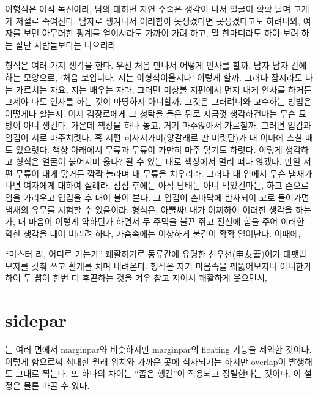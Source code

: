 \documentclass{oblivoir}
\begin{document}
이형식은 아직 독신이라, 남의  대하면 자연 수줍은 생각이 나서 얼굴이 확확 달며 고개가 저절로 숙여진다. 남자로 생겨나서 이러함이 못생겼다면 못생겼다고도 하려니와, 여자를 보면 아무러한 핑계를 얻어서라도 가까이 가려 하고, 말 한마디라도 하여 보려 하는 잘난 사람들보다는 나으리라.

형식은 여러 가지 생각을 한다. 우선 처음 만나서 어떻게 인사를 할까. 남자 남자 간에 하는 모양으로, ‘처음 보입니다. 저는 이형식이올시다’ 이렇게 할까. 그러나 잠시라도 나는 가르치는 자요, 저는 배우는 자라, 그러면 미상불  저편에서 먼저 내게 인사를 하거든 그제야 나도 인사를 하는 것이 마땅하지 아니할까. 그것은 그러려니와 교수하는 방법은 어떻게나 할는지. 어제 김장로에게 그 청탁을 들은 뒤로 지금껏 생각하건마는 무슨 묘방이 아니 생긴다. 가운데 책상을 하나 놓고, 거기 마주앉아서 가르칠까. 그러면 입김과 입김이 서로 마주치렷다. 혹 저편 히사시가미(양갈래로 딴 머릿단)가 내 이마에 스칠 때도 있으렷다. 책상 아래에서 무릎과 무릎이 가만히 마주 닿기도 하렷다. 이렇게 생각하고 형식은 얼굴이 붉어지며 옳다? 될 수 있는 대로 책상에서 멀리 떠나 앉겠다. 만일 저편 무릎이 내게 닿거든 깜짝 놀라며 내 무릎을 치우리라. 그러나 내 입에서 무슨 냄새가 나면 여자에게 대하여 실례라, 점심 후에는 아직 담배는 아니 먹었건마는, 하고 손으로 입을 가리우고 입김을 후 내어 불어 본다. 그 입김이 손바닥에 반사되어 코로 들어가면 냄새의 유무를 시험할 수 있음이라. 형식은, 아뿔싸! 내가 어찌하여 이러한 생각을 하는가, 내 마음이 이렇게 약하던가 하면서 두 주먹을 불끈 쥐고 전신에 힘을 주어 이러한 약한 생각을 떼어 버리려 하나, 가슴속에는 이상하게 불길이 확확 일어난다. 이때에,

“미스터 리, 어디로 가는가”  쾌활하기로 동류간에 유명한 신우선(申友善)이가 대팻밥 모자를 갖춰 쓰고 활개를 치며 내려온다. 형식은 자기 마음속을 꿰뚫어보지나 아니한가 하여 두 뺨이 한번 더 후끈하는 것을 겨우 참고 지어서 쾌활하게 웃으면서, 

\newpage

\renewcommand*\sideparfont{\footnotesize\sffamily}

\section{sidepar}

\begin{framed}
는 여러 면에서 marginpar와 비슷하지만 marginpar의 floating 기능을
제외한 것이다. 이렇게 함으로써 최대한 원래 위치와 가까운 곳에 식자되기는 하지만 
overlap이 발생해도 그대로 찍는다. 또 하나의 차이는 ``좁은 행간''이 적용되고  정렬한다는 것이다. 이 설정은 물론 바꿀 수 있다.
\end{framed}
\end{document}
